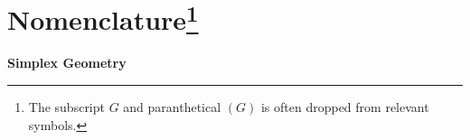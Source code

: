 \chapter*{Nomenclature\footnote{The subscript $G$ and paranthetical $(G)$ is often dropped from relevant symbols.}}

\newlength{\colwidth} %
\newlength{\groupsep} %
\newlength{\headingsep} %
\newlength{\descsep} %
\setlength{\colwidth}{3.5cm}
\setlength{\groupsep}{0cm}
\setlength{\headingsep}{-0.40cm}
\setlength{\descsep}{8cm}

\textbf{Simplex Geometry}\\
\vspace{\headingsep}

